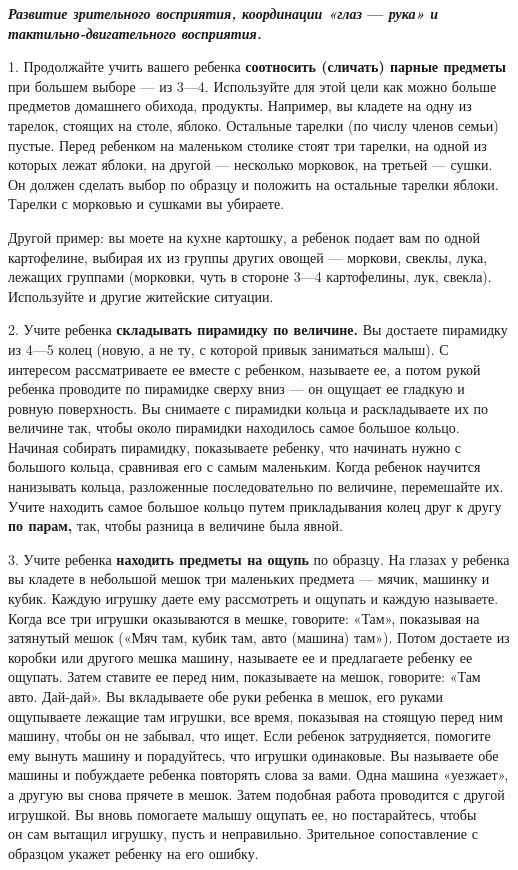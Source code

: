\documentclass[a5paper]{book}
\renewcommand{\emph}[1]{\textit{#1}}
\begin{document}
\textbf{\emph{Развитие зрительного восприятия, координации «глаз} ---
\emph{рука» и тактильно-двигательного восприятия.}}

1. Продолжайте учить вашего ребенка \textbf{соотносить (сличать) парные
предметы} при большем выборе --- из 3---4. Используйте для этой цели как
можно больше предметов домашнего обихода, продукты. Например, вы кладете
на одну из тарелок, стоящих на столе, яблоко. Остальные тарелки (по
числу членов семьи) пустые. Перед ребенком на маленьком столике стоят
три тарелки, на одной из которых лежат яблоки, на другой --- несколько
морковок, на третьей --- сушки. Он должен сделать выбор по образцу и
положить на остальные тарелки яблоки. Тарелки с морковью и сушками вы
убираете.

Другой пример: вы моете на кухне картошку, а ребенок подает вам по одной
картофелине, выбирая их из группы других овощей --- моркови, свеклы,
лука, лежащих группами (морковки, чуть в стороне 3---4 картофелины, лук,
свекла). Используйте и другие житейские ситуации.

2. Учите ребенка \textbf{складывать пирамидку по величине.} Вы достаете
пирамидку из 4---5 колец (новую, а не ту, с которой привык заниматься
малыш). С интересом рассматриваете ее вместе с ребенком, называете ее, а
потом рукой ребенка проводите по пирамидке сверху вниз --- он ощущает ее
гладкую и ровную поверхность. Вы снимаете с пирамидки кольца и
раскладываете их по величине так, чтобы около пирамидки находилось самое
большое кольцо. Начиная собирать пирамидку, показываете ребенку, что
начинать нужно с большого кольца, сравнивая его с самым маленьким. Когда
ребенок научится нанизывать кольца, разложенные последовательно по
величине, перемешайте их. Учите находить самое большое кольцо путем
прикладывания колец друг к другу \textbf{по парам,} так, чтобы разница в
величине была явной.

3. Учите ребенка \textbf{находить предметы на ощупь} по образцу. На
глазах у ребенка вы кладете в небольшой мешок три маленьких предмета ---
мячик, машинку и кубик. Каждую игрушку даете ему рассмотреть и ощупать и
каждую называете. Когда все три игрушки оказываются в мешке, говорите:
«Там», показывая на затянутый мешок («Мяч там, кубик там, авто (машина)
там»). Потом достаете из коробки или другого мешка машину, называете ее
и предлагаете ребенку ее ощупать. Затем ставите ее перед ним,
показываете на мешок, говорите: «Там авто. Дай-дай». Вы вкладываете обе
руки ребенка в мешок, его руками ощупываете лежащие там игрушки, все
время, показывая на стоящую перед ним машину, чтобы он не забывал, что
ищет. Если ребенок затрудняется, помогите ему вынуть машину и
порадуйтесь, что игрушки одинаковые. Вы называете обе машины и
побуждаете ребенка повторять слова за вами. Одна машина «уезжает», а
другую вы снова прячете в мешок. Затем подобная работа проводится с
другой игрушкой. Вы вновь помогаете малышу ощупать ее, но постарайтесь,
чтобы\\
он сам вытащил игрушку, пусть и неправильно. Зрительное сопоставление с
образцом укажет ребенку на его ошибку.
\end{document}

